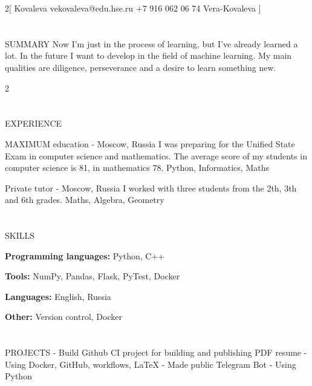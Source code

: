 \documentclass{my_cv}
\begin{document}
\begin{multicols}{2}[
        {Kovaleva}%
        {}%
        {vekovaleva@edu.hse.ru}%
        {+7 916 062 06 74}%
        {Vera-Kovaleva}%
        {}%
]
\end{multicols}

\section{\faFileText}{SUMMARY}
Now I'm just in the process of learning, but I've already learned a lot. In the future I want to develop in the field of machine learning. My main qualities are diligence, perseverance and a desire to learn something new.

\begin{multicols}{2}
\section{\faPencil}{EXPERIENCE}

%
    {MAXIMUM education - Moscow, Russia}%
    {I was preparing for the Unified State Exam in computer science and mathematics. The average score of my students in computer science is 81, in mathematics 78.}%
    {Python, Informatics, Maths}
    
%
    {Private tutor - Moscow, Russia}%
    {I worked with three students from the 2th, 3th and 6th grades.}
    {Maths, Algebra, Geometry}
    
\section{\faList}{SKILLS}

\textbf{Programming languages:} Python, C++

\noindent\textbf{Tools:} NumPy, Pandas, Flask, PyTest, Docker

\noindent\textbf{Languages:} English, Russia

\noindent\textbf{Other:} Version control, Docker

\columnbreak

\section{\faPaintBrush}{PROJECTS}
    {- Build Github CI project for building and publishing PDF resume}%
    {- Using Docker, GitHub, workflows, LaTeX}
    {- Made public Telegram Bot}%
    {- Using Python}


\end{multicols}
\end{document}
